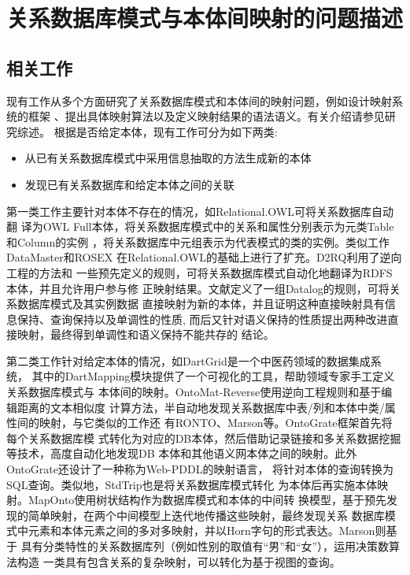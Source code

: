 \chapter{关系数据库模式与本体间映射的问题描述}
\label{chap01}

\section{相关工作}

现有工作从多个方面研究了关系数据库模式和本体间的映射问题，例如设计映射系统的框架
、提出具体映射算法以及定义映射结果的语法语义。有关介绍请参见研究综述\cite{4,7}。
根据是否给定本体，现有工作可分为如下两类:

\begin{itemize}
	\item 从已有关系数据库模式中采用信息抽取的方法生成新的本体
	\item 发现已有关系数据库和给定本体之间的关联
\end{itemize}

第一类工作主要针对本体不存在的情况，如Relational.OWL\cite{33}可将关系数据库自动翻
译为OWL Full本体，将关系数据库模式中的关系和属性分别表示为元类Table和Column的实例
，将关系数据库中元组表示为代表模式的类的实例。类似工作DataMaster\cite{34}和ROSEX
\cite{35}在Relational.OWL的基础上进行了扩充。D2RQ\cite{11}利用了逆向工程的方法和
一些预先定义的规则，可将关系数据库模式自动化地翻译为RDFS本体，并且允许用户参与修
正映射结果。文献\cite{13}定义了一组Datalog的规则，可将关系数据库模式及其实例数据
直接映射为新的本体，并且证明这种直接映射具有信息保持、查询保持以及单调性的性质,
而后又针对语义保持的性质提出两种改进直接映射，最终得到单调性和语义保持不能共存的
结论。

第二类工作针对给定本体的情况，如DartGrid是一个中医药领域的数据集成系统\cite{25}，
其中的DartMapping模块提供了一个可视化的工具，帮助领域专家手工定义关系数据库模式与
本体间的映射。OntoMat-Reverse\cite{26}使用逆向工程规则和基于编辑距离的文本相似度
计算方法，半自动地发现关系数据库中表/列和本体中类/属性间的映射，与它类似的工作还
有RONTO\cite{27}、Marson\cite{24}等。OntoGrate框架\cite{28}首先将每个关系数据库模
式转化为对应的DB本体，然后借助记录链接和多关系数据挖掘等技术，高度自动化地发现DB
本体和其他语义网本体之间的映射。此外OntoGrate还设计了一种称为Web-PDDL的映射语言，
将针对本体的查询转换为SQL查询。类似地，StdTrip\cite{29}也是将关系数据库模式转化
为本体后再实施本体映射。MapOnto\cite{10}使用树状结构作为数据库模式和本体的中间转
换模型，基于预先发现的简单映射，在两个中间模型上迭代地传播这些映射，最终发现关系
数据库模式中元素和本体元素之间的多对多映射，并以Horn字句的形式表达。Marson则基于
具有分类特性的关系数据库列（例如性别的取值有``男''和``女''），运用决策数算法构造
一类具有包含关系的复杂映射，可以转化为基于视图的查询。

